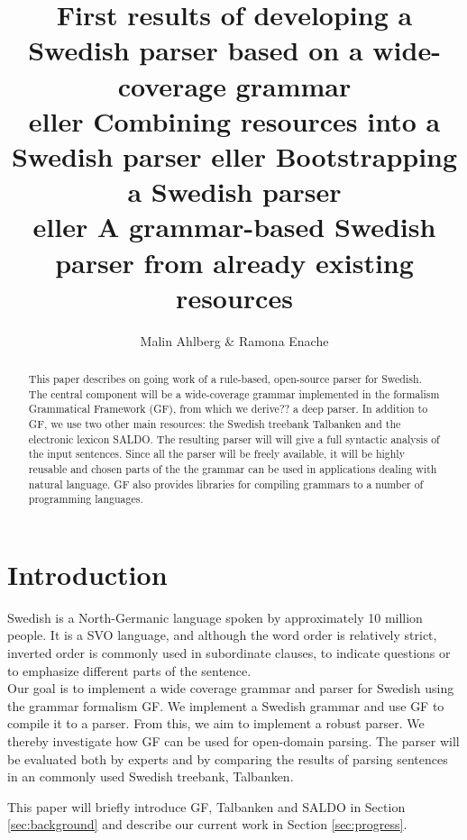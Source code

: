 \documentclass[submission]{eptcs} %
\title{First results of developing a Swedish parser based on a wide-coverage grammar\\
        eller Combining resources into a Swedish parser
        eller Bootstrapping a Swedish parser \\
        eller A grammar-based Swedish parser from already existing resources}
\author{Malin Ahlberg \& Ramona Enache
\institute{Department of Computer Science \& Engineering, Gothenburg University, Sweden}
}
\begin{document}
\maketitle

\begin{abstract}
This paper describes on going work of a rule-based, open-source
parser for Swedish. The central component will be a wide-coverage grammar
implemented in the formalism Grammatical Framework (GF), from which we 
derive?? a deep parser.
In addition to GF, we use two other main resources: the Swedish
treebank Talbanken and the electronic lexicon SALDO.
The resulting parser will 
will give a full syntactic analysis of the input sentences.
Since all the parser will be freely available, 
it will be highly reusable and chosen parts of the the grammar can be used in
applications dealing with
natural language. GF also provides libraries for compiling
grammars to a number of programming languages.

\end{abstract}

\section{Introduction}
Swedish is a North-Germanic language spoken by approximately 10 million people.
It is a SVO language, and although the word order is relatively strict,
inverted order is commonly used
in subordinate clauses, to indicate questions or to emphasize different parts of the sentence. \\
Our goal is to implement a wide coverage grammar and parser for Swedish
using the grammar formalism GF. 
We implement a Swedish grammar and use GF to compile it to a parser.
From this, we aim to implement a robust parser. 
We thereby investigate how GF
can be used for open-domain parsing.
The parser will be evaluated both by experts and by comparing the results of
parsing sentences in an commonly used Swedish treebank, Talbanken.

This paper will briefly introduce GF, Talbanken and SALDO in Section \ref{sec:background}
and describe our current work in Section \ref{sec:progress}.
\end{document}
